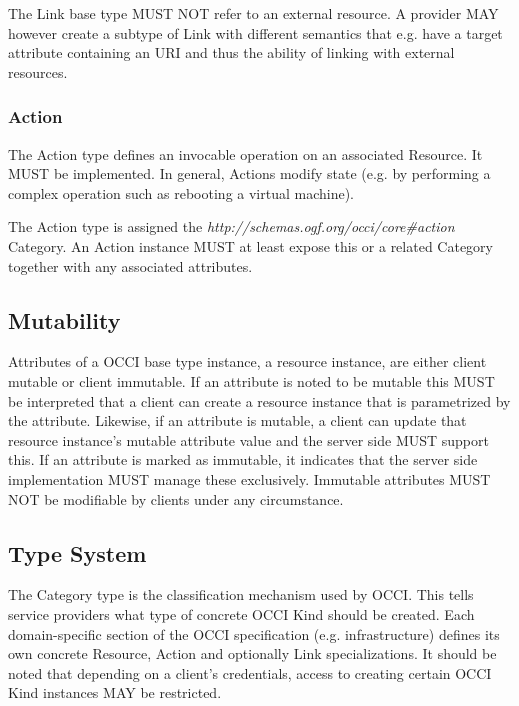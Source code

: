 \documentclass[10pt,a4paper]{article}
\begin{document}
The Link base type MUST NOT refer to an external resource. A provider MAY however create a subtype of Link with different semantics that e.g. have a target attribute containing an URI and thus the ability of linking with external resources.

\subsubsection{Action}
The Action type defines an invocable operation on an associated Resource. It MUST be implemented. In general, Actions modify state (e.g. by performing a complex operation such as rebooting a virtual machine).

The Action type is assigned the \textit{http://schemas.ogf.org/occi/core\#action} Category. An Action instance MUST at least expose this or a related Category together with any associated attributes.

\subsection{Mutability}
Attributes of a OCCI base type instance, a resource instance, are either client mutable or client immutable. If an attribute is noted to be mutable this MUST be interpreted that a client can create a resource instance that is parametrized by the attribute. Likewise, if an attribute is mutable, a client can update that resource instance's mutable attribute value and the server side MUST support this. If an attribute is marked as immutable, it indicates that the server side implementation MUST manage these exclusively. Immutable attributes MUST NOT be modifiable by clients under any circumstance.

\subsection{Type System}
\label{sec:type_system}
The Category type is the classification mechanism used by OCCI. This tells service providers what type of concrete OCCI Kind should be created. Each domain-specific section of the OCCI specification (e.g. infrastructure) defines its own concrete Resource, Action and optionally Link specializations. It should be noted that depending on a client's credentials, access to creating certain OCCI Kind instances MAY be restricted.
\end{document}
